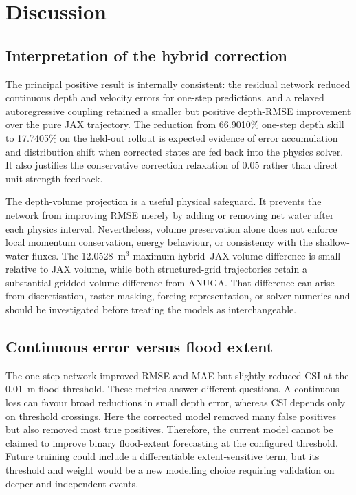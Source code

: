 \section{Discussion}
\label{sec:discussion}

\subsection{Interpretation of the hybrid correction}

The principal positive result is internally consistent: the residual network
reduced continuous depth and velocity errors for one-step predictions, and a
relaxed autoregressive coupling retained a smaller but positive depth-RMSE
improvement over the pure JAX trajectory.  The reduction from 66.9010\%
one-step depth skill to 17.7405\% on the held-out rollout is expected evidence
of error accumulation and distribution shift when corrected states are fed
back into the physics solver.  It also justifies the conservative correction
relaxation of 0.05 rather than direct unit-strength feedback.

The depth-volume projection is a useful physical safeguard.  It prevents the
network from improving RMSE merely by adding or removing net water after each
physics interval.  Nevertheless, volume preservation alone does not enforce
local momentum conservation, energy behaviour, or consistency with the
shallow-water fluxes.  The 12.0528~m\(^3\) maximum hybrid--JAX volume
difference is small relative to JAX volume, while both structured-grid
trajectories retain a substantial gridded volume difference from ANUGA.  That
difference can arise from discretisation, raster masking, forcing
representation, or solver numerics and should be investigated before treating
the models as interchangeable.

\subsection{Continuous error versus flood extent}

The one-step network improved RMSE and MAE but slightly reduced CSI at the
0.01~m flood threshold.  These metrics answer different questions.  A
continuous loss can favour broad reductions in small depth error, whereas CSI
depends only on threshold crossings.  Here the corrected model removed many
false positives but also removed most true positives.  Therefore, the current
model cannot be claimed to improve binary flood-extent forecasting at the
configured threshold.  Future training could include a differentiable
extent-sensitive term, but its threshold and weight would be a new modelling
choice requiring validation on deeper and independent events.

